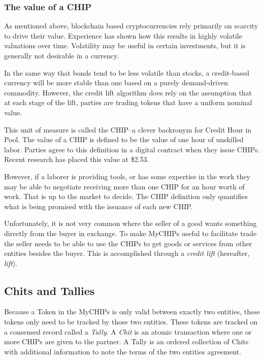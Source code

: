 \documentclass[runningheads]{llncs}
\begin{document}
\subsubsection{The value of a CHIP}
As mentioned above, blockchain based cryptocurrencies rely primarily on scarcity to drive their value.
Experience has shown how this results in highly volatile valuations over time.
Volatility may be useful in certain investments, but it is generally not desirable in a currency.

In the same way that bonds tend to be less volatile than stocks, a credit-based currency will be more stable than one based on a purely demand-driven commodity.
However, the credit lift algorithm does rely on the assumption that at each stage of the lift, parties are trading tokens that have a uniform nominal value.

This unit of measure is called the CHIP--a clever backronym for Credit Hour in Pool.
The value of a CHIP is defined to be the value of one hour of unskilled labor. Parties agree to this definition in a digital contract when they issue CHIPs. Recent research has placed this value at \$2.53. \cite{bateman_chip_value}

However, if a laborer is providing tools, or has some expertise in the work they may be able to negotiate receiving more than one CHIP for an hour worth of work.
That is up to the market to decide.
The CHIP definition only quantifies what is being promised with the issuance of each new CHIP.

Unfortunately, it is not very common where the seller of a good wants something directly from the buyer in exchange. To make MyCHIPs useful to facilitate trade the seller needs to be able to use the CHIPs to get goods or services from other entities besides the buyer. This is accomplished through a \emph{credit lift} (hereafter, \emph{lift}).

\subsection{Chits and Tallies}
Because a Token in the MyCHIPs is only valid between exactly two entities, these tokens only need to be tracked by those two entities. These tokens are tracked on a consensed record called a \emph{Tally}. A \emph{Chit} is an atomic transaction where one or more CHIPs are given to the partner. A Tally is an ordered collection of Chits with additional information to note the terms of the two entities agreement. 
\end{document}
